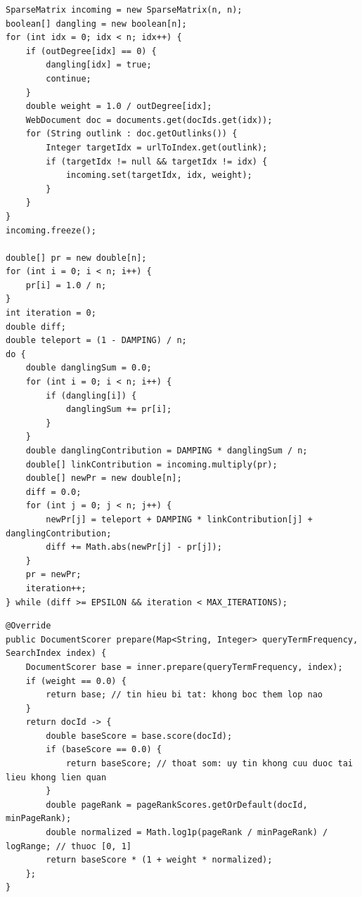\documentclass[9pt,twocolumn,a4paper]{extarticle}
\newcommand{\code}[1]{\texttt{#1}}
\begin{document}
\begin{minipage}{\linewidth}
\begin{lstlisting}[caption={\code{ranking/PageRankService.java}, \code{computePageRank}: dựng ma trận thưa và vòng lặp lũy thừa (trích)},label={lst:pagerank}]
SparseMatrix incoming = new SparseMatrix(n, n);
boolean[] dangling = new boolean[n];
for (int idx = 0; idx < n; idx++) {
    if (outDegree[idx] == 0) {
        dangling[idx] = true;
        continue;
    }
    double weight = 1.0 / outDegree[idx];
    WebDocument doc = documents.get(docIds.get(idx));
    for (String outlink : doc.getOutlinks()) {
        Integer targetIdx = urlToIndex.get(outlink);
        if (targetIdx != null && targetIdx != idx) {
            incoming.set(targetIdx, idx, weight);
        }
    }
}
incoming.freeze();

double[] pr = new double[n];
for (int i = 0; i < n; i++) {
    pr[i] = 1.0 / n;
}
int iteration = 0;
double diff;
double teleport = (1 - DAMPING) / n;
do {
    double danglingSum = 0.0;
    for (int i = 0; i < n; i++) {
        if (dangling[i]) {
            danglingSum += pr[i];
        }
    }
    double danglingContribution = DAMPING * danglingSum / n;
    double[] linkContribution = incoming.multiply(pr);
    double[] newPr = new double[n];
    diff = 0.0;
    for (int j = 0; j < n; j++) {
        newPr[j] = teleport + DAMPING * linkContribution[j] + danglingContribution;
        diff += Math.abs(newPr[j] - pr[j]);
    }
    pr = newPr;
    iteration++;
} while (diff >= EPSILON && iteration < MAX_ITERATIONS);
\end{lstlisting}
\end{minipage}
\par\vspace{4pt}

\begin{minipage}{\linewidth}
\begin{lstlisting}[caption={\code{ranking/decorator/PageRankBoostScorer.java}, \code{prepare}: nhân điểm cơ sở với hệ số PageRank},label={lst:prboost}]
@Override
public DocumentScorer prepare(Map<String, Integer> queryTermFrequency, SearchIndex index) {
    DocumentScorer base = inner.prepare(queryTermFrequency, index);
    if (weight == 0.0) {
        return base; // tin hieu bi tat: khong boc them lop nao
    }
    return docId -> {
        double baseScore = base.score(docId);
        if (baseScore == 0.0) {
            return baseScore; // thoat som: uy tin khong cuu duoc tai lieu khong lien quan
        }
        double pageRank = pageRankScores.getOrDefault(docId, minPageRank);
        double normalized = Math.log1p(pageRank / minPageRank) / logRange; // thuoc [0, 1]
        return baseScore * (1 + weight * normalized);
    };
}
\end{lstlisting}
\end{minipage}
\par\vspace{4pt}
\end{document}
